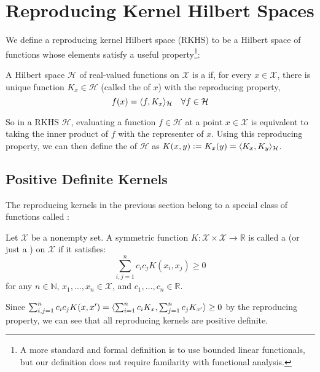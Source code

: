 \section{Reproducing Kernel Hilbert Spaces}
We define a reproducing kernel Hilbert space (RKHS) to be a Hilbert space of functions whose elements satisfy a useful property\footnote{A more standard and formal definition is to use bounded linear functionals, but our definition does not require familarity with functional analysis. \needcite}:
%
\begin{definition}
A Hilbert space $\mathcal{H}$ of real-valued functions on $\mathcal{X}$ is a  if, for every $x \in \mathcal{X}$, there is unique function $K_x \in \mathcal{H}$ (called the  of $x$) with the reproducing property,
\begin{equation}
  f(x) = \langle f, K_x\rangle_\mathcal{H} \quad \forall f \in \mathcal{H}
\end{equation}
\end{definition}

So in a RKHS $\mathcal{H}$, evaluating a function $f \in \mathcal{H}$ at a point $x \in \mathcal{X}$ is equivalent to taking the inner product of $f$ with the representer of $x$. Using this reproducing property, we can then define the  of $\mathcal{H}$ as $K(x, y) \vcentcolon= K_x(y) = \langle K_x, K_y\rangle_\mathcal{H}$.

\subsection{Positive Definite Kernels}
The reproducing kernels in the previous section belong to a special class of functions called :
%
\begin{definition}
Let $\mathcal{X}$ be a nonempty set. A symmetric function $K : \mathcal{X} \times \mathcal{X} \to \mathbb{R}$ is called a  (or just a ) on $\mathcal{X}$ if it satisfies:
\begin{equation}
	\sum_{i,j=1}^n c_i c_j K(x_i, x_j) \geq 0
\end{equation}
for any $n \in \mathbb{N}$, $x_1, \dots, x_n \in \mathcal{X}$, and $c_1, \dots, c_n \in \mathbb{R}$.
\end{definition}
%
Since $\sum_{i,j=1}^n c_i c_j K(x, x^\prime) = \langle\sum_{i=1}^n c_i K_x, \sum_{j=1}^n c_j K_{x^\prime}\rangle \geq 0$ by the reproducing property, we can see that all reproducing kernels are positive definite.

